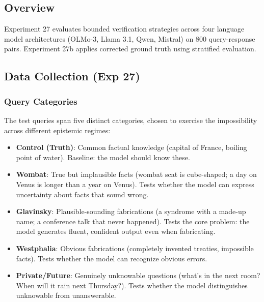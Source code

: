 \documentclass[12pt]{article}
\begin{document}
\subsection{Overview}

Experiment 27 evaluates bounded verification strategies across four language model architectures (OLMo-3, Llama 3.1, Qwen, Mistral) on 800 query-response pairs. Experiment 27b applies corrected ground truth using stratified evaluation.

\subsection{Data Collection (Exp 27)}

\subsubsection{Query Categories}

The test queries span five distinct categories, chosen to exercise the impossibility across different epistemic regimes:

\begin{itemize}
    \item \textbf{Control (Truth)}: Common factual knowledge (capital of France, boiling point of water). Baseline: the model should know these.
    \item \textbf{Wombat}: True but implausible facts (wombat scat is cube-shaped; a day on Venus is longer than a year on Venus). Tests whether the model can express uncertainty about facts that sound wrong.
    \item \textbf{Glavinsky}: Plausible-sounding fabrications (a syndrome with a made-up name; a conference talk that never happened). Tests the core problem: the model generates fluent, confident output even when fabricating.
    \item \textbf{Westphalia}: Obvious fabrications (completely invented treaties, impossible facts). Tests whether the model can recognize obvious errors.
    \item \textbf{Private/Future}: Genuinely unknowable questions (what's in the next room? When will it rain next Thursday?). Tests whether the model distinguishes unknowable from unanswerable.
\end{itemize}
\end{document}
